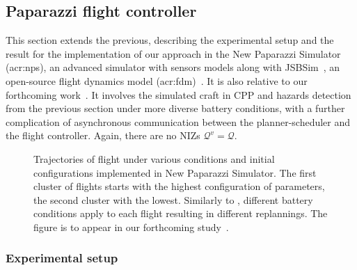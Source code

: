 \subsection{Paparazzi flight controller}
\label{sec:res-papa}

This section extends the previous, describing the experimental setup and the result for the implementation of our approach in the New Paparazzi Simulator (\Gls{acr:nps}), an advanced simulator with sensors models along with JSBSim~\citep{berndt2004jsbsim}, an open-source flight dynamics model (\Gls{acr:fdm})~\citep{papanps}. It is also relative to our forthcoming work~\citep{seewald202Xenergy}. It involves the simulated craft in CPP and hazards detection from the previous section under more diverse battery conditions, with a further complication of asynchronous communication between the planner-scheduler and the flight controller. Again, there are no NIZs $\mathcal{Q}^v=\mathcal{Q}$.

\begin{figure}[p!]
  \centering
  \selectfont
  \footnotesize    
  
  \caption[Trajectories of flight under various conditions and initial configurations in New Paparazzi Simulator]{Trajectories of flight under various conditions and initial configurations implemented in New Paparazzi Simulator. The first cluster of flights  starts with the highest configuration of parameters, the second cluster  with the lowest. Similarly to , different battery conditions apply to each flight resulting in different replannings. The figure is to appear in our forthcoming study~\citep{seewald202Xenergy}.}
  \label{fig:trajs-pprz}
\end{figure}

\subsubsection*{Experimental setup}

